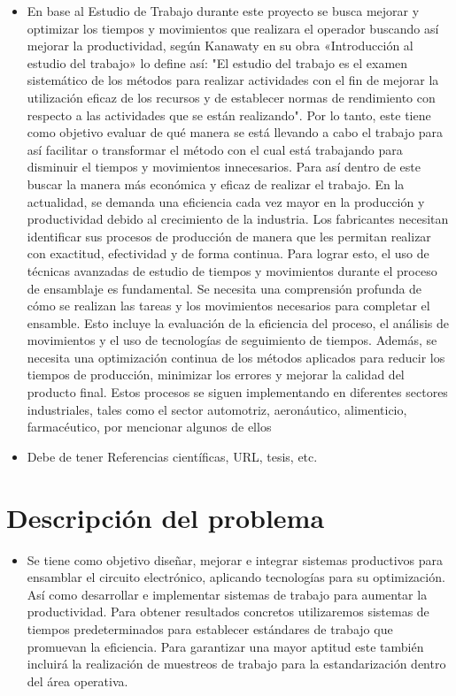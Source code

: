     \begin{itemize}
        \item En base al Estudio de Trabajo durante este proyecto se busca mejorar y optimizar los tiempos y movimientos que realizara el operador buscando así mejorar la productividad, según Kanawaty en su obra «Introducción al estudio del trabajo» lo define así: "El estudio del trabajo es el examen sistemático de los métodos para realizar actividades con el fin de mejorar la utilización eficaz de los recursos y de establecer normas de rendimiento con respecto a las actividades que se están realizando". Por lo tanto, este tiene como objetivo evaluar de qué manera se está llevando a cabo el trabajo para así facilitar o transformar el método con el cual está trabajando para disminuir el tiempos y movimientos innecesarios. Para así dentro de este buscar la manera más económica y eficaz de realizar el trabajo.
 En la actualidad, se demanda una eficiencia cada vez mayor en la producción y productividad debido al crecimiento de la industria. Los fabricantes necesitan identificar sus procesos de producción de manera que les permitan realizar con exactitud, efectividad y de forma continua.
 Para lograr esto, el uso de técnicas avanzadas de estudio de tiempos y movimientos durante el proceso de ensamblaje es fundamental. Se necesita una comprensión profunda de cómo se realizan las tareas y los movimientos necesarios para completar el ensamble. Esto incluye la evaluación de la eficiencia del proceso, el análisis de movimientos y el uso de tecnologías de seguimiento de tiempos. Además, se necesita una optimización continua de los métodos aplicados para reducir los tiempos de producción, minimizar los errores y mejorar la calidad del producto final.
 Estos procesos se siguen implementando en diferentes sectores industriales, tales como el sector automotriz, aeronáutico, alimenticio, farmacéutico, por mencionar algunos de ellos

        \item Debe de tener Referencias científicas, URL, tesis, etc.
    \end{itemize}
    \section{Descripción del problema}
    \begin{itemize}
        \item Se tiene como objetivo diseñar, mejorar e integrar sistemas productivos para ensamblar el circuito electrónico, aplicando tecnologías para su optimización. Así como desarrollar e implementar sistemas de trabajo para aumentar la productividad. Para obtener resultados concretos utilizaremos sistemas de tiempos predeterminados para establecer estándares de trabajo que promuevan la eficiencia. Para garantizar una mayor aptitud este también incluirá la realización de muestreos de trabajo para la estandarización dentro del área operativa. 
    \end{itemize}
    
